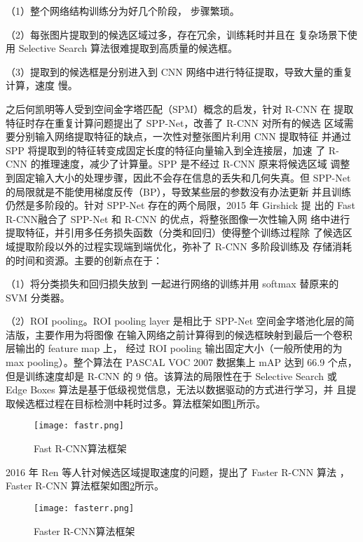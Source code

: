 （1）整个网络结构训练分为好几个阶段，
步骤繁琐。

（2）每张图片提取到的候选区域过多，存在冗余，训练耗时并且在
复杂场景下使用 Selective Search 算法很难提取到高质量的候选框。

（3）提取到的候选框是分别进入到 CNN 网络中进行特征提取，导致大量的重复计算，速度
慢。

之后何凯明等人受到空间金字塔匹配（SPM）概念的启发，针对 R-CNN 在
提取特征时存在重复计算问题提出了 SPP-Net\cite{purkait2017spp}，改善了 R-CNN 对所有的候选
区域需要分别输入网络提取特征的缺点，一次性对整张图片利用 CNN 提取特征
并通过 SPP 将提取到的特征转变成固定长度的特征向量输入到全连接层，加速
了 R-CNN 的推理速度，减少了计算量。SPP 是不经过 R-CNN 原来将候选区域
调整到固定输入大小的处理步骤，因此不会存在信息的丢失和几何失真。但
SPP-Net 的局限就是不能使用梯度反传（BP），导致某些层的参数没有办法更新
并且训练仍然是多阶段的。针对 SPP-Net 存在的两个局限，2015 年 Girshick 提
出的 Fast R-CNN\cite{girshick2015fast}融合了 SPP-Net 和 R-CNN 的优点，将整张图像一次性输入网
络中进行提取特征，并引用多任务损失函数（分类和回归）使得整个训练过程除
了候选区域提取阶段以外的过程实现端到端优化，弥补了 R-CNN 多阶段训练及
存储消耗的时间和资源。主要的创新点在于：

（1）将分类损失和回归损失放到
一起进行网络的训练并用 softmax 替原来的 SVM 分类器。

（2）ROI pooling。ROI
pooling layer 是相比于 SPP-Net 空间金字塔池化层的简洁版，主要作用为将图像
在输入网络之前计算得到的候选框映射到最后一个卷积层输出的 feature map 上，
经过 ROI pooling 输出固定大小（一般所使用的为 max pooling）。整个算法在
PASCAL VOC 2007 数据集上 mAP 达到 66.9%
个点，但是训练速度却是 R-CNN 的 9 倍。该算法的局限性在于 Selective Search
或 Edge Boxes 算法是基于低级视觉信息，无法以数据驱动的方式进行学习，并
且提取候选框过程在目标检测中耗时过多。算法框架如图\ref{fastr}所示。

\begin{figure}[htbp]
    \centering
    \texttt{[image: fastr.png]}
    \caption{Fast R-CNN算法框架}
    \label{fastr}
\end{figure}

2016 年 Ren 等人针对候选区域提取速度的问题，提出了 Faster R-CNN 算法
\cite{ren2015faster}，Faster R-CNN 算法框架如图\ref{fasterr}所示。

\begin{figure}[htbp]
    \centering
    \texttt{[image: fasterr.png]}
    \caption{Faster R-CNN算法框架}
    \label{fasterr}
\end{figure}


